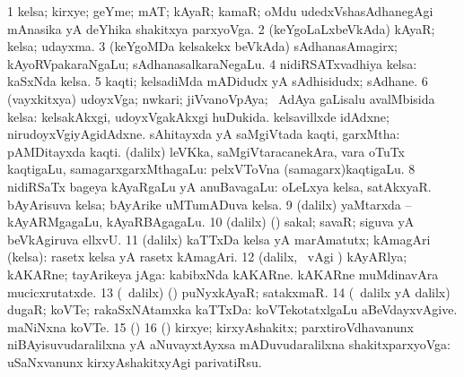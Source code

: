 {{{{{{\begin{center}
\bentry
{} 
\gl{\nA}
\expl{}
\bmng
\bnum
\num{1} kelsa; kirxye; geYme; mAT; kAyaR; kamaR; oMdu udedxVshasAdhanegAgi mAnasika yA deYhika shakitxya parxyoVga. 
\num{2} (keYgoLaLxbeVkAda) kAyaR; kelsa; udayxma. 
\num{3} (keYgoMDa kelsakekx beVkAda) sAdhanasAmagirx; kAyoRVpakaraNgaLu; sAdhanasalkaraNegaLu. 
\num{4} nidiRSATxvadhiya kelsa:  kaSxNda kelsa. 
\num{5} kaqti; kelsadiMda mADidudx yA sAdhisidudx; sAdhane. 
\num{6} (vayxkitxya) udoyxVga; nwkari; jiVvanoVpAya; \kanmu\ AdAya gaLisalu avalMbisida kelsa:  kelsakAkxgi, udoyxVgakAkxgi huDukida.  kelsavillxde idAdxne; nirudoyxVgiyAgidAdxne. 
\banum
{} sAhitayxda yA saMgiVtada kaqti, garxMtha:  pAMDitayxda kaqti. 
 (\bava dalilx) leVKka, saMgiVtaracanekAra, \mo vara oTuTx kaqtigaLu, samagarxgarxMthagaLu:  pelxVToVna (samagarx)kaqtigaLu. 
\eanum
\numie
\num{8} nidiRSaTx bageya kAyaRgaLu yA anuBavagaLu:  oLeLxya kelsa, satAkxyaR.  bAyArisuva kelsa; bAyArike uMTumADuva kelsa. 
\num{9} (\bava dalilx) yaMtarxda -- kAyARMgagaLu, kAyaRBAgagaLu. 
\num{10} (\bava dalilx) (\AmA) sakal; savaR; siguva yA beVkAgiruva ellxvU. 
\num{11} (\bava dalilx) kaTTxDa kelsa yA marAmatutx; kAmagAri (kelsa):  rasetx kelsa yA rasetx kAmagAri. 
\num{12} (\bava dalilx, \sA\ \Eva vAgi \parx) kAyARlya; kAKARne; tayArikeya jAga:  kabibxNda kAKARne.  kAKARne muMdinavAra mucicxrutatxde. 
\num{13} (\sA\ \bava dalilx) (\deVva) puNyxkAyaR; satakxmaR. 
\num{14} (\sA\ \bava dalilx yA \saMpa dalilx) dugaR; koVTe; rakaSxNAtamxka kaTTxDa:  koVTekotatxlgaLu aBeVdayxvAgive.  maNiNxna koVTe. 
\num{15} (\pArxparx)  
\num{16} (\Bwvi) kirxye; kirxyAshakitx; parxtiroVdhavanunx niBAyisuvudaralilxna yA aNuvayxtAyxsa mADuvudaralilxna shakitxparxyoVga:  uSaNxvanunx kirxyAshakitxyAgi parivatiRsu. 
\enum
\emng


\end{center}}}}}}}
